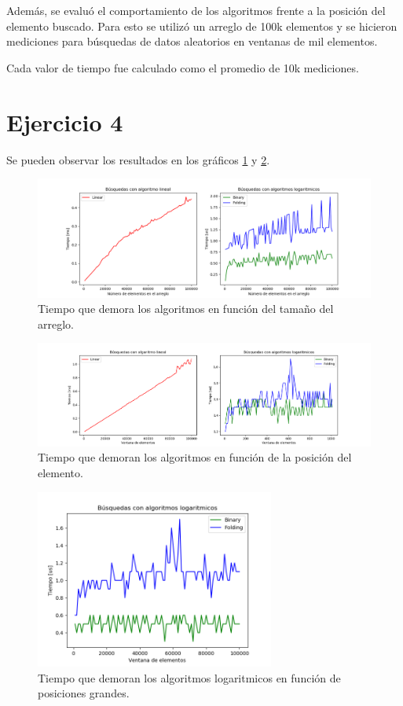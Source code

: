 \documentclass[]{article}
\begin{document}
Además, se evaluó el comportamiento de los algoritmos frente a la posición del elemento buscado. Para esto se utilizó un arreglo de 100k elementos y se hicieron mediciones para búsquedas de datos aleatorios en ventanas de mil elementos.

Cada valor de tiempo fue calculado como el promedio de 10k mediciones.

\section{Ejercicio 4}

Se pueden observar los resultados en los gráficos \ref{fig:1} y \ref{fig:2}.

\begin{figure}[tb]
	\centering
	\includegraphics[width=1\textwidth]{Busqueda por tamanio}
	\caption{Tiempo que demora los algoritmos en función del tamaño del arreglo.}
	\label{fig:1}
\end{figure}

\begin{figure}[tb]
	\centering
	\includegraphics[width=1\textwidth]{Busqueda por p}
	\caption{Tiempo que demoran los algoritmos en función de la posición del elemento.}
	\label{fig:2}
\end{figure}

\begin{figure}[tb]
	\centering
	\includegraphics[width=0.7\textwidth]{Busqueda por p grande}
	\caption{Tiempo que demoran los algoritmos logaritmicos en función de posiciones grandes.}
	\label{fig:3}
\end{figure}
\end{document}
